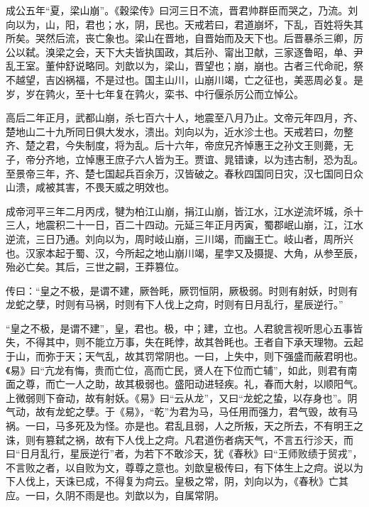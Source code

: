 \documentclass[12pt,UTF8]{ctexbook}
\begin{document}
成公五年“夏，梁山崩”。《穀梁传》曰河三日不流，晋君帅群臣而哭之，乃流。刘向以为，山，阳，君也；水，阴，民也。天戒若曰，君道崩坏，下乱，百姓将失其所矣。哭然后流，丧亡象也。梁山在晋地，自晋始而及天下也。后晋暴杀三卿，厉公以弑。溴梁之会，天下大夫皆执国政，其后孙、甯出卫献，三家逐鲁昭，单、尹乱王室。董仲舒说略同。刘歆以为，梁山，晋望也；崩，崩也。古者三代命祀，祭不越望，吉凶祸福，不是过也。国主山川，山崩川竭，亡之征也，美恶周必复。是岁，岁在鹑火，至十七年复在鹑火，栾书、中行偃杀厉公而立悼公。



高后二年正月，武都山崩，杀七百六十人，地震至八月乃止。文帝元年四月，齐、楚地山二十九所同日俱大发水，溃出。刘向以为，近水沴土也。天戒若曰，勿整齐、楚之君，今失制度，将为乱。后十六年，帝庶兄齐悼惠王之孙文王则薨，无子，帝分齐地，立悼惠王庶子六人皆为王。贾谊、晁错谏，以为违古制，恐为乱。至景帝三年，齐、楚七国起兵百余万，汉皆破之。春秋四国同日灾，汉七国同日众山溃，咸被其害，不畏天威之明效也。



成帝河平三年二月丙戌，犍为柏江山崩，捐江山崩，皆江水，江水逆流坏城，杀十三人，地震积二十一日，百二十四动。元延三年正月丙寅，蜀郡岷山崩，江，江水逆流，三日乃通。刘向以为，周时岐山崩，三川竭，而幽王亡。岐山者，周所兴也。汉家本起于蜀、汉，今所起之地山崩川竭，星孛又及摄提、大角，从参至辰，殆必亡矣。其后，三世之嗣，王莽篡位。



传曰：“皇之不极，是谓不建，厥咎眊，厥罚恒阴，厥极弱。时则有射妖，时则有龙蛇之孽，时则有马祸，时则有下人伐上之疴，时则有日月乱行，星辰逆行。”



“皇之不极，是谓不建”，皇，君也。极，中；建，立也。人君貌言视听思心五事皆失，不得其中，则不能立万事，失在眊悖，故其咎眊也。王者自下承天理物。云起于山，而弥于天；天气乱，故其罚常阴也。一曰，上失中，则下强盛而蔽君明也。《易》曰“亢龙有悔，贵而亡位，高而亡民，贤人在下位而亡辅”，如此，则君有南面之尊，而亡一人之助，故其极弱也。盛阳动进轻疾。礼，春而大射，以顺阳气。上微弱则下奋动，故有射妖。《易》曰“云从龙”，又曰“龙蛇之蛰，以存身也”。阴气动，故有龙蛇之孽。于《易》，“乾”为君为马，马任用而强力，君气毁，故有马祸。一曰，马多死及为怪。亦是也。君乱且弱，人之所叛，天之所去，不有明王之诛，则有篡弑之祸，故有下人伐上之疴。凡君道伤者病天气，不言五行沴天，而曰“日月乱行，星辰逆行”者，为若下不敢沴天，犹《春秋》曰“王师败绩于贸戎”，不言败之者，以自败为文，尊尊之意也。刘歆皇极传曰，有下体生上之疴。说以为下人伐上，天诛已成，不得复为疴云。皇极之常，阴，刘向以为，《春秋》亡其应。一曰，久阴不雨是也。刘歆以为，自属常阴。
\end{document}
